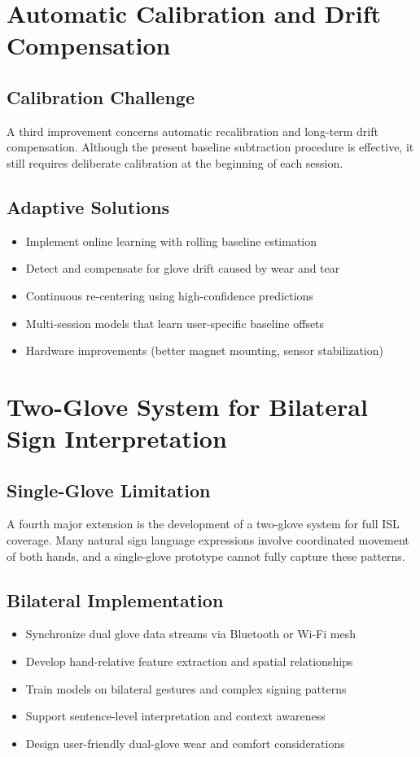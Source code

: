 \documentclass[12pt,a4paper]{report}
\begin{document}
\section{Automatic Calibration and Drift Compensation}
\label{sec:future_calibration}

\subsection{Calibration Challenge}
A third improvement concerns automatic recalibration and long-term drift compensation. Although the present baseline subtraction procedure is effective, it still requires deliberate calibration at the beginning of each session.

\subsection{Adaptive Solutions}
\begin{itemize}
  \item Implement online learning with rolling baseline estimation
  \item Detect and compensate for glove drift caused by wear and tear
  \item Continuous re-centering using high-confidence predictions
  \item Multi-session models that learn user-specific baseline offsets
  \item Hardware improvements (better magnet mounting, sensor stabilization)
\end{itemize}

\section{Two-Glove System for Bilateral Sign Interpretation}
\label{sec:future_bilateral}

\subsection{Single-Glove Limitation}
A fourth major extension is the development of a two-glove system for full ISL coverage. Many natural sign language expressions involve coordinated movement of both hands, and a single-glove prototype cannot fully capture these patterns.

\subsection{Bilateral Implementation}
\begin{itemize}
  \item Synchronize dual glove data streams via Bluetooth or Wi-Fi mesh
  \item Develop hand-relative feature extraction and spatial relationships
  \item Train models on bilateral gestures and complex signing patterns
  \item Support sentence-level interpretation and context awareness
  \item Design user-friendly dual-glove wear and comfort considerations
\end{itemize}
\end{document}
